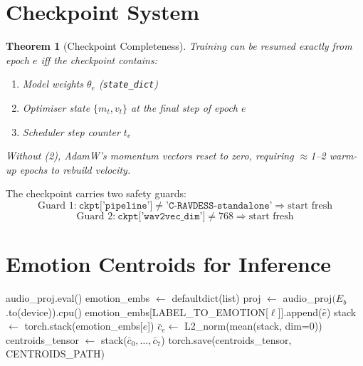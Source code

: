 \documentclass[12pt,a4paper]{article}
\theoremstyle{definition}
\theoremstyle{plain}
\newtheorem{theorem}{Theorem}[section]
\theoremstyle{remark}
\begin{document}
\section{Checkpoint System}

\begin{theorem}[Checkpoint Completeness]
Training can be resumed exactly from epoch $e$ iff the checkpoint contains:
\begin{enumerate}[nosep]
  \item Model weights $\theta_e$ (\texttt{state\_dict})
  \item Optimiser state $\{m_t, v_t\}$ at the final step of epoch $e$
  \item Scheduler step counter $t_e$
\end{enumerate}
Without (2), AdamW's momentum vectors reset to zero, requiring $\approx$1--2
warm-up epochs to rebuild velocity.
\end{theorem}

The checkpoint carries two safety guards:
\[
\text{Guard 1:}\ \texttt{ckpt['pipeline']} \neq \texttt{'C-RAVDESS-standalone'} \Rightarrow \text{start fresh}
\]
\[
\text{Guard 2:}\ \texttt{ckpt['wav2vec\_dim']} \neq 768 \Rightarrow \text{start fresh}
\]

\section{Emotion Centroids for Inference}

\begin{algorithm}[H]
\caption{Compute and Save Emotion Centroids}
\label{alg:centroids}
\begin{algorithmic}[1]
\State audio\_proj.eval()
\State emotion\_embs $\gets$ defaultdict(list)
  \State proj $\gets$ audio\_proj$(E_b$.to(device)).cpu() \Comment{$[B,512]$}
    \State emotion\_embs[LABEL\_TO\_EMOTION[$\ell$]].append($\hat{e}$)
  \EndFor
\EndFor
{}
  \State stack $\gets$ torch.stack(emotion\_embs[$e$]) \Comment{$[N_e,512]$}
  \State $\bar{c}_e \gets$ L2\_norm(mean(stack, dim=0))
\EndFor
\State centroids\_tensor $\gets$ stack($\bar{c}_0,\ldots,\bar{c}_7$) \Comment{$[8,512]$}
\State torch.save(centroids\_tensor, CENTROIDS\_PATH)
\end{algorithmic}
\end{algorithm}
\end{document}
